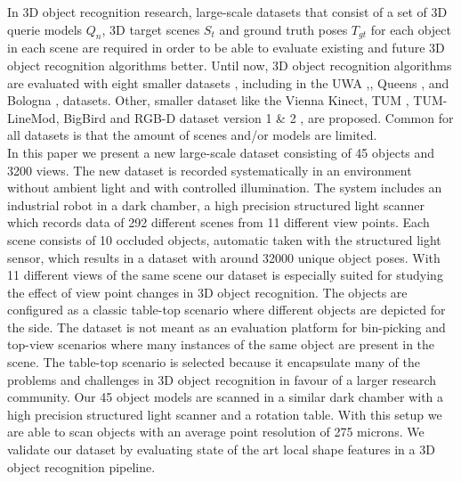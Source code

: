\documentclass[10pt,twocolumn,letterpaper]{article}
\begin{document}
In 3D object recognition research, large-scale datasets that consist of a set of 3D querie models $Q_n$, 3D target scenes $S_t$ and ground truth poses $T_{gt}$ for each object in each scene are required in order to be able to evaluate existing and future 3D object recognition algorithms better. Until now, 3D object recognition algorithms are evaluated with eight smaller datasets \cite{Guo2015}, including in the UWA \cite{Mian2006},\cite{Mian2010}, Queens \cite{Taati2007},\cite{Taati2007} and Bologna \cite{Salti2014},\cite{Tombari2010} datasets. Other, smaller dataset like the Vienna Kinect\cite{Aldoma2012}, TUM \cite{Rodola2013}, TUM-LineMod\cite{Hinterstoisser2012}, BigBird\cite{BigBIRD} and RGB-D dataset version 1 \& 2 \cite{Lai2011},\cite{Lai2014} are proposed. Common for all datasets is that the amount of scenes and/or models are limited.\\
\indent In this paper we present a new large-scale dataset consisting of 45 objects and 3200 views. The new dataset is recorded systematically in an environment without ambient light and with controlled illumination. The system includes an industrial robot in a dark chamber, a high precision structured light scanner which records data of 292 different scenes from 11 different view points. Each scene consists of 10 occluded objects, automatic taken with the structured light sensor, which results in a dataset with around 32000 unique object poses. With 11 different views of the same scene our dataset is especially suited for studying the effect of view point changes in 3D object recognition. The objects are configured as a classic table-top scenario where different objects are depicted for the side. The dataset is not meant as an evaluation platform for bin-picking and top-view scenarios where many instances of the same object are present in the scene. The table-top scenario is selected because it encapsulate many of the problems and challenges in 3D object recognition in favour of a larger research community.
Our 45 object models are scanned in a similar dark chamber with a high precision structured light scanner and a rotation table. With this setup we are able to scan objects with an average point resolution of 275 microns. We validate our dataset by evaluating state of the art local shape features in a 3D object recognition pipeline.\\ 
\end{document}
